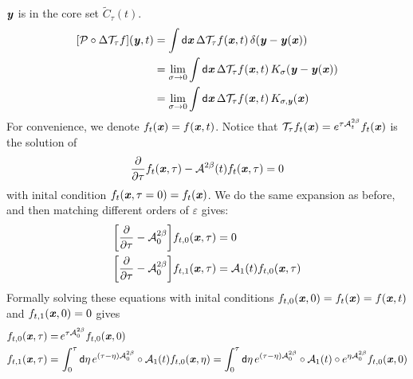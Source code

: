 \documentclass[aip,jcp,a4paper,reprint,onecolumn]{revtex4-1}
\newcommand{\vect}[1]{\textbf{\textit{#1}}}
\newcommand{\dd}{\textsf{d}}
\newcommand{\mt}{\mathcal T}
\newcommand{\fwg}{{\mathcal A}}
\begin{document}
$\vect y$ is in the core set $\widetilde C_\tau(t) $.
\begin{align}\nonumber
  [\mathcal P\circ\Delta \mt_\tau f](\vect y, t)
  &=
  \int
  \dd \vect x\,
  \Delta \mt_\tau f(\vect x, t) \,
  \delta (\vect y - \vect y(\vect x))  \\\nonumber
  &=
  \lim_{\sigma \rightarrow 0}
  \int
  \dd \vect x\,
  \Delta \mt_\tau f(\vect x, t) \,
  K_{\sigma} (\vect y - \vect y(\vect x))  \\\label{eqn:core-identify}
  &=
  \lim_{\sigma \rightarrow 0}
  \int
  \dd \vect x\,
  \Delta \mt_\tau f(\vect x, t) \,
  K_{\sigma, \vect y} (\vect x)
\end{align}
For convenience, we denote $f_t(\vect x) = f(\vect x, t)$.
Notice that $\mt_\tau f_t(\vect x) = e^{\tau \fwg_t^{2\beta}} f_t(\vect x)$
is the solution of
\begin{align}
  \frac{\partial}{\partial \tau} f_t(\vect x, \tau)
  -
  \fwg^{2\beta}(t)  f_t(\vect x, \tau)
  =0
\end{align}
with inital condition $f_t(\vect x, \tau = 0) = f_t(\vect x)$. We do the same
expansion as before, and then
matching different orders of $\varepsilon$ gives:
\begin{align}
  &\bigg[
  \frac{\partial}{\partial \tau}
  - \fwg_0^{2\beta}
  \bigg]
  f_{t,0}(\vect x, \tau)
  = 0 \\
  &\bigg[
  \frac{\partial}{\partial \tau}
  - \fwg_0^{2\beta}
  \bigg]
  f_{t,1}(\vect x, \tau)
  =
  \fwg_1(t) f_{t,0}(\vect x, \tau)
\end{align}
Formally solving these equations with
inital conditions $f_{t,0}(\vect x, 0) = f_t(\vect x) = f(\vect x, t)$
and  $f_{t,1}(\vect x, 0) = 0$ 
gives
\begin{align}\label{eqn:f0-1}
  f_{t,0}(\vect x, \tau)
  =&\,
  e^{\tau\fwg^{2\beta}_0}f_{t,0}(\vect x, 0) \\\label{eqn:f1-1}
  f_{t,1}(\vect x, \tau)
  =&\,
  \int_0^\tau\dd \eta\,
  e^{(\tau-\eta)\fwg^{2\beta}_0}\circ
  \fwg_1(t) f_{t,0}(\vect x,\eta)
  =
  \int_0^\tau\dd \eta\,
  e^{(\tau-\eta)\fwg^{2\beta}_0}\circ
  \fwg_1(t)\circ
  e^{\eta\fwg^{2\beta}_0}f_{t,0}(\vect x, 0) 
\end{align}
\end{document}
